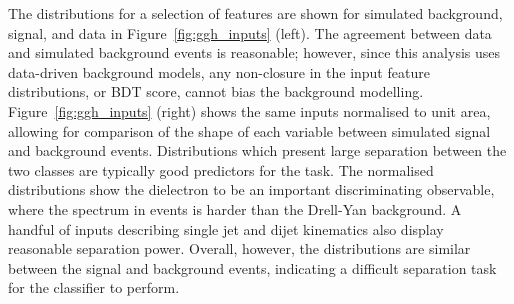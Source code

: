\noindent The distributions for a selection of features are shown for simulated background, \ggH signal, and data in Figure~\ref{fig:ggh_inputs} (left). The agreement between data and simulated background events is reasonable; however, since this analysis uses data-driven background models, any non-closure in the input feature distributions, or BDT score, cannot bias the background modelling. Figure~\ref{fig:ggh_inputs} (right) shows the same inputs normalised to unit area, allowing for comparison of the shape of each variable between simulated \ggH signal and background events. Distributions which present large separation between the two classes are typically good predictors for the task. The normalised distributions show the dielectron \pt to be an important discriminating observable, where the \pt spectrum in \ggH events is harder than the Drell-Yan background. A handful of inputs describing single jet and dijet kinematics also display reasonable separation power. Overall, however, the distributions are similar between the \Hee signal and background events, indicating a difficult separation task for the classifier to perform.

 

